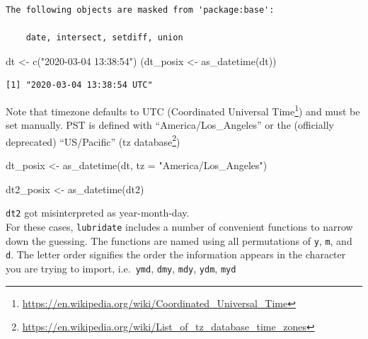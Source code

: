 \documentclass[
]{book}
\newenvironment{Shaded}{\begin{snugshade}}{\end{snugshade}}
\newcommand{\AttributeTok}[1]{\textcolor[rgb]{0.77,0.63,0.00}{#1}}
\newcommand{\FunctionTok}[1]{\textcolor[rgb]{0.00,0.00,0.00}{#1}}
\newcommand{\NormalTok}[1]{#1}
\newcommand{\OtherTok}[1]{\textcolor[rgb]{0.56,0.35,0.01}{#1}}
\newcommand{\StringTok}[1]{\textcolor[rgb]{0.31,0.60,0.02}{#1}}
\DeclareRobustCommand{\href}[2]{#2\footnote{\url{#1}}}
\renewcommand{\href}[2]{#2\footnote{\url{#1}}}
\begin{document}
\begin{verbatim}
The following objects are masked from 'package:base':

    date, intersect, setdiff, union
\end{verbatim}

\begin{Shaded}
\begin{Highlighting}[]
\NormalTok{dt }\OtherTok{\textless{}{-}} \FunctionTok{c}\NormalTok{(}\StringTok{"2020{-}03{-}04 13:38:54"}\NormalTok{)}
\NormalTok{(dt\_posix }\OtherTok{\textless{}{-}} \FunctionTok{as\_datetime}\NormalTok{(dt))}
\end{Highlighting}
\end{Shaded}

\begin{verbatim}
[1] "2020-03-04 13:38:54 UTC"
\end{verbatim}

Note that timezone defaults to UTC (\href{https://en.wikipedia.org/wiki/Coordinated_Universal_Time}{Coordinated Universal Time}) and must be set manually. PST is defined with ``America/Los\_Angeles'' or the (officially deprecated) ``US/Pacific'' (\href{https://en.wikipedia.org/wiki/List_of_tz_database_time_zones}{tz database})

\begin{Shaded}
\begin{Highlighting}[]
\NormalTok{dt\_posix }\OtherTok{\textless{}{-}} \FunctionTok{as\_datetime}\NormalTok{(dt, }\AttributeTok{tz =} \StringTok{"America/Los\_Angeles"}\NormalTok{)}
\end{Highlighting}
\end{Shaded}

\begin{Shaded}
\begin{Highlighting}[]
\NormalTok{dt2\_posix }\OtherTok{\textless{}{-}} \FunctionTok{as\_datetime}\NormalTok{(dt2)}
\end{Highlighting}
\end{Shaded}

\texttt{dt2} got misinterpreted as year-month-day.\\
For these cases, \texttt{lubridate} includes a number of convenient functions to narrow down the guessing. The functions are named using all permutations of \texttt{y}, \texttt{m}, and \texttt{d}. The letter order signifies the order the information appears in the character you are trying to import, i.e.~\texttt{ymd}, \texttt{dmy}, \texttt{mdy}, \texttt{ydm}, \texttt{myd}
\end{document}
